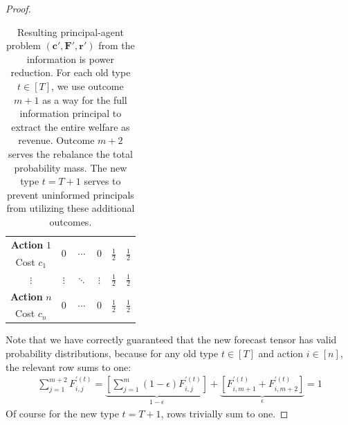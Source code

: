 \documentclass{article}
\newcommand{\cost}[1]{c_{#1}}
\newcommand{\costvector}{\bm{c}}
\newcommand{\ForecastTensor}{\bm{F}}
\newcommand{\rewardvector}{\bm{r}}
\newcommand{\PrincipalAgentProblemPrime}{\left(\costvector', \ForecastTensor', \rewardvector'\right)}
\newcommand{\forecastprime}[3]{F^{\prime(#1)}_{#2, #3}}
\begin{document}
\begin{proof}
\begin{table}
\begin{tabular}{cccccc}
  \textbf{Action} $1$ & \multirow{2}{*}{$0$} & \multirow{2}{*}{$\cdots$} & \multirow{2}{*}{$0$} & \multirow{2}{*}{$\tfrac12$} & \multirow{2}{*}{$\tfrac12$} \\ Cost $\cost{1}$ \\
  $\vdots$ & $\vdots$ & $\ddots$ & $\vdots$ & $\tfrac12$ & $\tfrac12$ \\
  \textbf{Action} $n$ & \multirow{2}{*}{$0$} & \multirow{2}{*}{$\cdots$} & \multirow{2}{*}{$0$} & \multirow{2}{*}{$\tfrac12$} & \multirow{2}{*}{$\tfrac12$} \\ Cost $\cost{n}$ \\
  \bottomrule
\end{tabular}
\caption{Resulting principal-agent problem $\PrincipalAgentProblemPrime$ from the information is power reduction. For each old type $t \in [T]$, we use outcome $m + 1$ as a way for the full information principal to extract the entire welfare as revenue. Outcome $m + 2$ serves the rebalance the total probability mass. The new type $t = T + 1$ serves to prevent uninformed principals from utilizing these additional outcomes.}
\label{tab:info-is-power}
\end{table}%
  
  Note that we have correctly guaranteed that the new forecast tensor has valid probability distributions, because for any old type $t \in [T]$ and action $i \in [n]$, the relevant row sums to one:
  \begin{align*}
    \sum_{j=1}^{m+2} \forecastprime{t}{i}{j}
      = \underbrace{\left[ \sum_{j=1}^m (1 - \epsilon) \forecastprime{t}{i}{j} \right]}_{1 - \epsilon}
      + \underbrace{\left[ \forecastprime{t}{i}{m+1} + \forecastprime{t}{i}{m+2} \right]}_{\epsilon}
      = 1
  \end{align*}
  Of course for the new type $t = T + 1$, rows trivially sum to one.
  

\end{proof}
\end{document}

